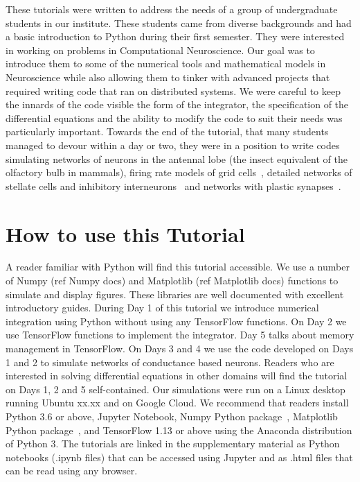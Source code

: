 \documentclass[10pt,letterpaper]{article}
\begin{document}
These tutorials were written to address the needs of a group of undergraduate students in our institute. These students came from diverse backgrounds and had a basic introduction to Python during their first semester. They were interested in working on problems in Computational Neuroscience. Our goal was to introduce them to some of the numerical tools and mathematical models in Neuroscience while also allowing them to tinker with advanced projects that required writing code that ran on distributed systems. We were careful to keep the innards of the code visible \textemdash the form of the integrator, the specification of the differential equations and the ability to modify the code to suit their needs was particularly important. Towards the end of the tutorial, that many students managed to devour within a day or two, they were in a position to write codes simulating networks of neurons in the antennal lobe  \cite{Bazhenov2001}  (the insect equivalent of the olfactory bulb in mammals), firing rate models of grid cells~\cite{Burak2009}, detailed networks of stellate cells and inhibitory interneurons~\cite{Neru2019} and networks with plastic synapses~\cite{Bazhenov2005}. 


\section*{How to use this Tutorial}
A reader familiar with Python will find this tutorial accessible. We use a number of Numpy (ref Numpy docs) and Matplotlib (ref Matplotlib docs) functions to simulate and display figures. These libraries are well documented with excellent introductory guides. During Day 1 of this tutorial we introduce numerical integration using Python without using any TensorFlow functions. On Day 2 we use TensorFlow functions to implement the integrator. Day 5 talks about memory management in TensorFlow. On Days 3 and 4 we use the code developed on Days 1 and 2 to simulate networks of conductance based neurons. Readers who are interested in solving differential equations in other domains will find the tutorial on Days 1, 2 and 5 self-contained.  Our simulations were run on a Linux desktop running Ubuntu xx.xx and on Google Cloud. We recommend that readers install Python 3.6 or above, Jupyter Notebook, Numpy Python package~\cite{numpy}, Matplotlib Python package~\cite{matplotlib}, and TensorFlow 1.13 or above using the Anaconda distribution of Python 3. The tutorials are linked in the supplementary material as Python notebooks (.ipynb files) that can be accessed using Jupyter and as .html files that can be read using any browser.
\end{document}
